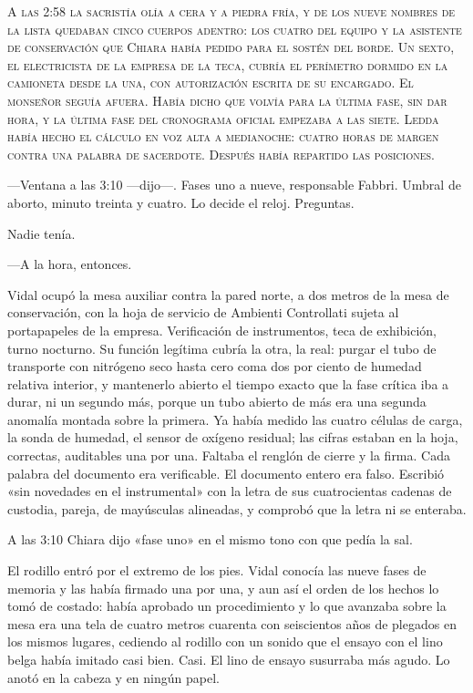 \lettrine[lines=2, lhang=0.1, nindent=0.2em]{A}{ las 2:58 la sacristía olía a cera y a piedra fría, y de los nueve nombres de la lista quedaban cinco cuerpos adentro: los cuatro del equipo y la asistente de conservación que Chiara había pedido para el sostén del borde. Un sexto, el electricista de la empresa de la teca, cubría el perímetro dormido en la camioneta desde la una, con autorización escrita de su encargado. El monseñor seguía afuera. Había dicho que volvía para la última fase, sin dar hora, y la última fase del cronograma oficial empezaba a las siete. Ledda había hecho el cálculo en voz alta a medianoche: cuatro horas de margen contra una palabra de sacerdote. Después había repartido las posiciones.}


---Ventana a las 3:10 ---dijo---. Fases uno a nueve, responsable Fabbri. Umbral de aborto, minuto treinta y cuatro. Lo decide el reloj. Preguntas.

Nadie tenía.

---A la hora, entonces.

Vidal ocupó la mesa auxiliar contra la pared norte, a dos metros de la mesa de conservación, con la hoja de servicio de Ambienti Controllati sujeta al portapapeles de la empresa. Verificación de instrumentos, teca de exhibición, turno nocturno. Su función legítima cubría la otra, la real: purgar el tubo de transporte con nitrógeno seco hasta cero coma dos por ciento de humedad relativa interior, y mantenerlo abierto el tiempo exacto que la fase crítica iba a durar, ni un segundo más, porque un tubo abierto de más era una segunda anomalía montada sobre la primera. Ya había medido las cuatro células de carga, la sonda de humedad, el sensor de oxígeno residual; las cifras estaban en la hoja, correctas, auditables una por una. Faltaba el renglón de cierre y la firma. Cada palabra del documento era verificable. El documento entero era falso. Escribió «sin novedades en el instrumental» con la letra de sus cuatrocientas cadenas de custodia, pareja, de mayúsculas alineadas, y comprobó que la letra ni se enteraba.

A las 3:10 Chiara dijo «fase uno» en el mismo tono con que pedía la sal.

El rodillo entró por el extremo de los pies. Vidal conocía las nueve fases de memoria y las había firmado una por una, y aun así el orden de los hechos lo tomó de costado: había aprobado un procedimiento y lo que avanzaba sobre la mesa era una tela de cuatro metros cuarenta con seiscientos años de plegados en los mismos lugares, cediendo al rodillo con un sonido que el ensayo con el lino belga había imitado casi bien. Casi. El lino de ensayo susurraba más agudo. Lo anotó en la cabeza y en ningún papel.

